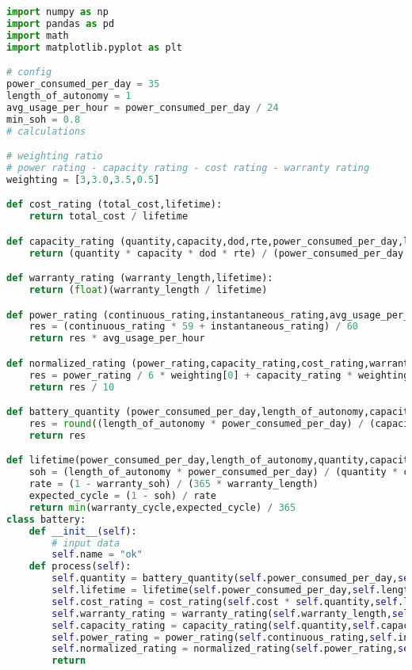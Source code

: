 \lstset{
breaklines=true
}
\begin{lstlisting}[language=python]
import numpy as np
import pandas as pd
import math
import matplotlib.pyplot as plt

# config
power_consumed_per_day = 35
length_of_autonomy = 1
avg_usage_per_hour = power_consumed_per_day / 24
min_soh = 0.8
# calculations

# weighting ratio
# power rating - capacity rating - cost rating - warranty rating 
weighting = [3,3.0,3.5,0.5]

def cost_rating (total_cost,lifetime):
    return total_cost / lifetime

def capacity_rating (quantity,capacity,dod,rte,power_consumed_per_day,length_of_autonomy):
    return (quantity * capacity * dod * rte) / (power_consumed_per_day * length_of_autonomy)

def warranty_rating (warranty_length,lifetime):
    return (float)(warranty_length / lifetime)

def power_rating (continuous_rating,instantaneous_rating,avg_usage_per_hour):
    res = (continuous_rating * 59 + instantaneous_rating) / 60
    return res * avg_usage_per_hour

def normalized_rating (power_rating,capacity_rating,cost_rating,warranty_rating):
    res = power_rating / 6 * weighting[0] + capacity_rating * weighting[1] + weighting[2] * (1 - (cost_rating / 1000) / 100) + weighting[3] * warranty_rating
    return res / 10

def battery_quantity (power_consumed_per_day,length_of_autonomy,capacity,dod,rte):
    res = round((length_of_autonomy * power_consumed_per_day) / (capacity * dod * rte * min_soh))
    return res

def lifetime(power_consumed_per_day,length_of_autonomy,quantity,capacity,dod,rte,warranty_length,warranty_soh,warranty_cycle):
    soh = (length_of_autonomy * power_consumed_per_day) / (quantity * capacity * dod * rte)
    rate = (1 - warranty_soh) / (365 * warranty_length)
    expected_cycle = (1 - soh) / rate
    return min(warranty_cycle,expected_cycle) / 365
class battery:
    def __init__(self):
        # input data
        self.name = "ok"
    def process(self):
        self.quantity = battery_quantity(self.power_consumed_per_day,self.length_of_autonomy,self.capacity,self.dod,self.rte)
        self.lifetime = lifetime(self.power_consumed_per_day,self.length_of_autonomy,self.quantity,self.capacity,self.dod,self.rte,self.warranty_length,self.warranty_soh,self.warranty_cycle)
        self.cost_rating = cost_rating(self.cost * self.quantity,self.lifetime)
        self.warranty_rating = warranty_rating(self.warranty_length,self.lifetime)
        self.capacity_rating = capacity_rating(self.quantity,self.capacity,self.dod,self.rte,self.power_consumed_per_day,self.length_of_autonomy)
        self.power_rating = power_rating(self.continuous_rating,self.instantaneous_rating,self.avg_usage_per_hour)
        self.normalized_rating = normalized_rating(self.power_rating,self.capacity_rating,self.cost_rating,self.warranty_rating)
        return


\end{lstlisting}
